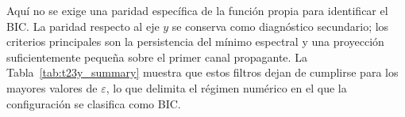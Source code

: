 \documentclass[11pt]{article}
\begin{document}
%
%

Aquí no se exige una paridad específica de la función propia para identificar el BIC. La paridad respecto al eje \(y\) se conserva como diagnóstico secundario; los criterios principales son la persistencia del mínimo espectral y una proyección suficientemente pequeña sobre el primer canal propagante. La Tabla~\ref{tab:t23y_summary} muestra que estos filtros dejan de cumplirse para los mayores valores de \(\varepsilon\), lo que delimita el régimen numérico en el que la configuración se clasifica como BIC.
\end{document}
